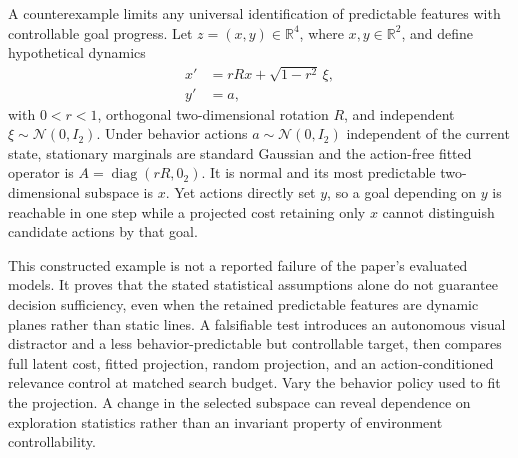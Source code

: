 A counterexample limits any universal identification of predictable features with controllable goal progress. Let $z=(x,y)\in\mathbb R^4$, where $x,y\in\mathbb R^2$, and define hypothetical dynamics
\begin{align}
 x'&=rR x+\sqrt{1-r^2}\,\xi,\\
 y'&=a,
\end{align}
with $0<r<1$, orthogonal two-dimensional rotation $R$, and independent $\xi\sim\mathcal N(0,I_2)$. Under behavior actions $a\sim\mathcal N(0,I_2)$ independent of the current state, stationary marginals are standard Gaussian and the action-free fitted operator is $A=\operatorname{diag}(rR,0_2)$. It is normal and its most predictable two-dimensional subspace is $x$. Yet actions directly set $y$, so a goal depending on $y$ is reachable in one step while a projected cost retaining only $x$ cannot distinguish candidate actions by that goal.

This constructed example is not a reported failure of the paper's evaluated models. It proves that the stated statistical assumptions alone do not guarantee decision sufficiency, even when the retained predictable features are dynamic planes rather than static lines. A falsifiable test introduces an autonomous visual distractor and a less behavior-predictable but controllable target, then compares full latent cost, fitted projection, random projection, and an action-conditioned relevance control at matched search budget. Vary the behavior policy used to fit the projection. A change in the selected subspace can reveal dependence on exploration statistics rather than an invariant property of environment controllability.
